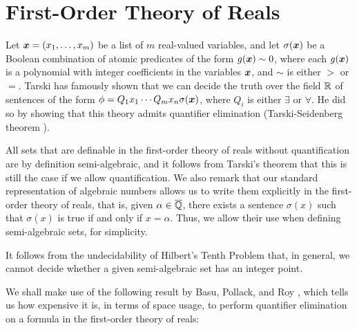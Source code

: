 \section{First-Order Theory of Reals}

Let $\boldsymbol{x}=(x_1,\ldots,x_m)$ be a list of $m$ real-valued
variables, and let $\sigma(\boldsymbol{x})$ be a Boolean combination
of atomic predicates of the form $g(\boldsymbol{x})\sim 0$, where each
$g(\boldsymbol{x})$ is a polynomial with integer coefficients in the
variables $\boldsymbol{x}$, and $\sim$ is either $>$ or $=$. Tarski
has famously shown that we can decide the truth over the field
$\mathbb{R}$ of sentences of the form $\phi=Q_1 x_1 \cdots Q_m x_n
\sigma(\boldsymbol{x})$, where $Q_i$ is either $\exists$ or
$\forall$. He did so by showing that this theory admits quantifier
elimination (Tarski-Seidenberg theorem \cite{Tar51}).


All sets that are definable in the first-order theory of reals without
quantification are by definition semi-algebraic, and it follows from
Tarski's theorem that this is still the case if we allow
quantification. We also remark that our standard representation of
algebraic numbers allows us to write them explicitly in the
first-order theory of reals, that is, given $\alpha\in\overline{\mathbb{Q}}$,
there exists a sentence $\sigma(x)$ such that $\sigma(x)$ is true if
and only if $x=\alpha$. Thus, we allow their use when defining
semi-algebraic sets, for simplicity.

It follows from the undecidability of Hilbert's Tenth Problem that, in
general, we cannot decide whether a given semi-algebraic set has an
integer point.

We shall make use of the following result by Basu, Pollack, and Roy
\cite{BasuPR96}, which tells us how expensive it is, in terms of space
usage, to perform quantifier elimination on a formula in the
first-order theory of reals:

